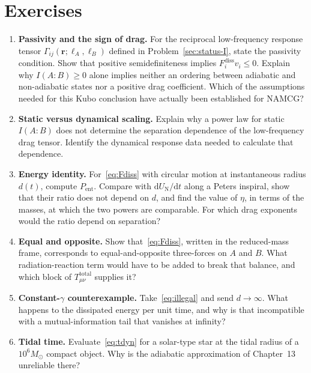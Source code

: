 \section{Exercises}
\label{sec:ch14-exercises}

\begin{enumerate}
  \item \textbf{Passivity and the sign of drag.}
    For the reciprocal low-frequency response tensor
    \(\Gamma_{ij}(\mathbf r;\ell_A,\ell_B)\) defined in
    Problem~\ref{sec:status-I}, state the passivity condition.
    Show that positive semidefiniteness implies
    \(F_i^{\mathrm{diss}}v_i\leq0\). Explain why
    \(I(A:B)\geq0\) alone implies neither an ordering between
    adiabatic and non-adiabatic states nor a positive drag
    coefficient. Which of the assumptions needed for this Kubo
    conclusion have actually been established for NAMCG?
  \item \textbf{Static versus dynamical scaling.}
    Explain why a power law for static \(I(A:B)\) does not determine
    the separation dependence of the low-frequency drag tensor.
    Identify the dynamical response data needed to calculate that
    dependence.
  \item \textbf{Energy identity.}
    For~\eqref{eq:Fdiss} with circular motion at instantaneous
    radius \(d(t)\), compute \(P_{\mathrm{ent}}\). Compare with
    \(\mathrm{d}U_{\mathrm{N}}/\mathrm{d}t\) along a Peters
    inspiral, show that their ratio does not depend on \(d\), and
    find the value of \(\eta\), in terms of the masses, at which the
    two powers are comparable. For which drag exponents would the
    ratio depend on separation?
  \item \textbf{Equal and opposite.}
    Show that~\eqref{eq:Fdiss}, written in the reduced-mass
    frame, corresponds to equal-and-opposite three-forces on
    \(A\) and \(B\). What radiation-reaction term would have
    to be added to break that balance, and which block of
    \(T_{\mu\nu}^{\mathrm{total}}\) supplies it?
  \item \textbf{Constant-\(\gamma\) counterexample.}
    Take~\eqref{eq:illegal} and send \(d\to\infty\). What
    happens to the dissipated energy per unit time, and why
    is that incompatible with a mutual-information tail that
    vanishes at infinity?
  \item \textbf{Tidal time.}
    Evaluate~\eqref{eq:tdyn} for a solar-type star at the tidal
    radius of a \(10^6 M_\odot\) compact object. Why is the
    adiabatic approximation of Chapter~13 unreliable there?
\end{enumerate}


